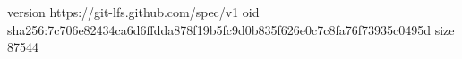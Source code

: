 version https://git-lfs.github.com/spec/v1
oid sha256:7c706e82434ca6d6ffdda878f19b5fc9d0b835f626e0c7c8fa76f73935c0495d
size 87544
